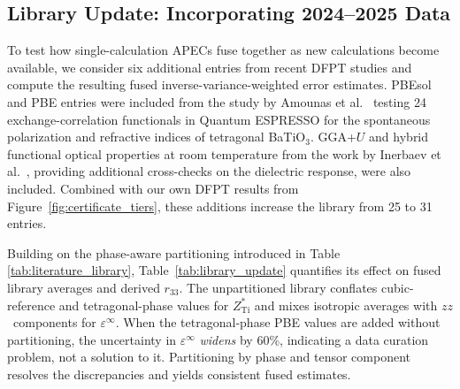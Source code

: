 \documentclass[twocolumn,superscriptaddress,amsmath,amssymb,longbibliography]{revtex4-2}
\begin{document}
\subsection{Library Update: Incorporating 2024--2025 Data}
\label{sec:library_update}

To test how single-calculation APECs fuse together as new calculations become available, we consider six additional entries from recent DFPT studies and compute the resulting fused inverse-variance-weighted  error estimates.
PBEsol and PBE entries were included from the study by Amounas et al.\ \cite{Amounas2024} testing 24 exchange-correlation functionals
in Quantum ESPRESSO for the spontaneous polarization and refractive indices
of tetragonal BaTiO$_3$.
 GGA+$U$
and hybrid functional optical properties at room temperature from the work by  Inerbaev et al.\ \cite{Inerbaev2025}, providing
additional cross-checks on the dielectric response, were also included. Combined with our own
DFPT results from Figure~\ref{fig:certificate_tiers}, these additions
increase the library from 25 to 31 entries.

Building on the phase-aware partitioning introduced in Table \ref{tab:literature_library}, Table~\ref{tab:library_update} quantifies its effect
on fused library averages and derived $r_{33}$. The unpartitioned library
conflates cubic-reference and tetragonal-phase values for
$Z^*_{\mathrm{Ti}}$ and mixes isotropic averages with $zz$~components for
$\varepsilon^\infty$. When the tetragonal-phase PBE values are added
without partitioning, the uncertainty in $\varepsilon^\infty$  \emph{widens}
by 60\%, indicating a data curation problem, not a solution to it.
Partitioning by phase and tensor component resolves the discrepancies
and yields consistent fused estimates.
\end{document}
